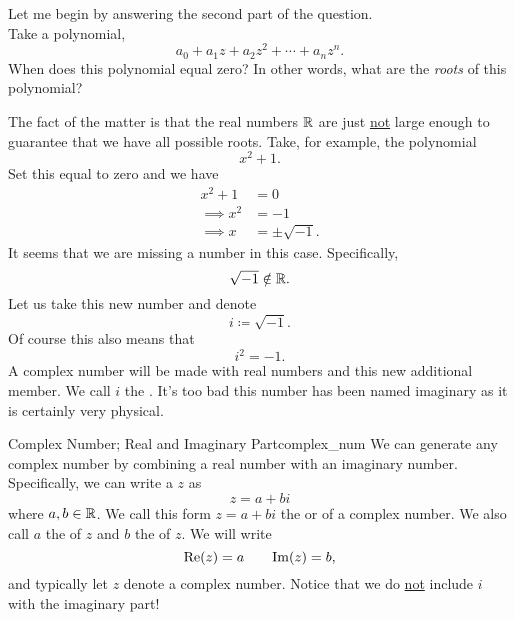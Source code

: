        \begin{answer}
        Let me begin by answering the second part of the question.\\  
        
        \noindent Take a polynomial,
        \[
        a_0+a_1 z + a_2 z^2 + \cdots + a_n z^n.
        \]
        When does this polynomial equal zero?  In other words, what are the \emph{roots} of this polynomial?
        
        The fact of the matter is that the real numbers $\mathbb{R}$ are just \underline{not} large enough to guarantee that we have all possible roots. Take, for example, the polynomial
        \[
        x^2+1.
        \]
        Set this equal to zero and we have
        \begin{align*}
            x^2+1&=0\\
            \implies x^2&=-1\\
            \implies x&=\pm \sqrt{-1}.
        \end{align*}
        It seems that we are missing a number in this case.  Specifically, 
        \[
        \sqrt{-1}\notin \mathbb{R}.
        \]
        Let us take this new number and denote
        \[
        i\coloneqq\sqrt{-1}.
        \]
        Of course this also means that
        \[
        i^2=-1.
        \]
        A complex number will be made with real numbers and this new additional member. We call $i$ the .  It's too bad this number has been named imaginary as it is certainly very physical.
        \end{answer}
        
        \begin{df}{Complex Number; Real and Imaginary Part}{complex_num}
        We can generate any complex number by combining a real number with an imaginary number. Specifically, we can write a  $z$ as
        \[
        z=a+bi
        \]
        where $a,b\in \mathbb{R}$. We call this form $z=a+bi$ the  or  of a complex number. We also call $a$ the  of $z$ and $b$ the  of $z$.  We will write
        \[
        \mathrm{Re}(z)=a \qquad \mathrm{Im}(z)=b,
        \]
        and typically let $z$ denote a complex number. Notice that we do \underline{not} include $i$ with the imaginary part!
        \end{df}
        
